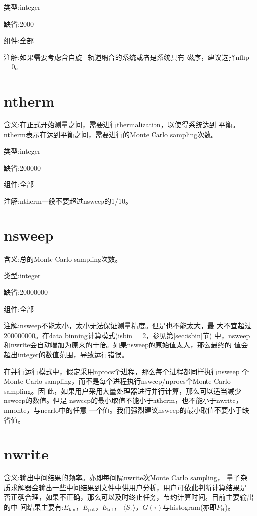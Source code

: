 {\color{green}类型}:integer

{\color{blue}缺省}:2000

{\color{brown}组件}:全部

{\color{purple}注解}:如果需要考虑含自旋$-$轨道耦合的系统或者是系统具有
磁序，建议选择nflip = 0。

\section{ntherm}
\label{sec:ntherm}

{\color{red}含义}:在正式开始测量之间，需要进行thermalization，以使得系统达到
平衡。ntherm表示在达到平衡之间，需要进行的Monte Carlo sampling次数。

{\color{green}类型}:integer

{\color{blue}缺省}:200000

{\color{brown}组件}:全部

{\color{purple}注解}:ntherm一般不要超过nsweep的1/10。

\section{nsweep}
\label{sec:nsweep}

{\color{red}含义}:总的Monte Carlo sampling次数。

{\color{green}类型}:integer

{\color{blue}缺省}:20000000

{\color{brown}组件}:全部

{\color{purple}注解}:nsweep不能太小，太小无法保证测量精度。但是也不能太大，最
大不宜超过200000000。在data binning计算模式(isbin = 2，参见第\ref{sec:isbin}节)
中，nsweep和nwrite会自动增加为原来的十倍。如果nsweep的原始值太大，那么最终的
值会超出integer的数值范围，导致运行错误。

在并行运行模式中，假定采用nprocs个进程，那么每个进程都同样执行nsweep
个Monte Carlo sampling，而不是每个进程执行nsweep/nprocs个Monte Carlo sampling。因
此，如果用户采用大量处理器进行并行计算，那么可以适当减少nsweep的数值。但是
nsweep的最小取值不能小于ntherm，也不能小于nwrite，nmonte，与ncarlo中的任意
一个值。我们强烈建议nsweep的最小取值不要小于缺省值。

\section{nwrite}
\label{sec:nwrite}

{\color{red}含义}:输出中间结果的频率。亦即每间隔nwrite次Monte Carlo sampling，
量子杂质求解器会输出一些中间结果到文件中供用户分析，用户可依此判断计算结果是
否正确合理，如果不正确，那么可以及时终止任务，节约计算时间。目前主要输出的中
间结果主要有:$E_{\text{kin}}$，$E_{\text{pot}}$，$E_{\text{tot}}$，
$\langle S_{z} \rangle$，$G(\tau)$与histogram(亦即$P_{\text{H}}$)。

